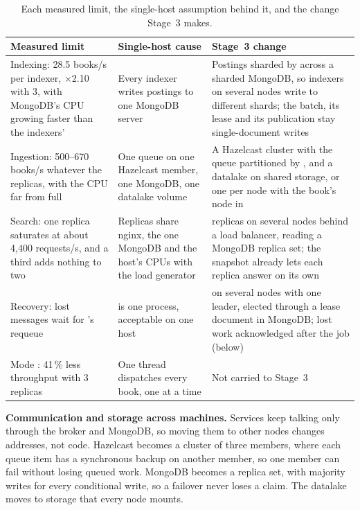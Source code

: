 \begin{table}[ht]
\centering
\small
\caption{Each measured limit, the single-host assumption behind it, and the change Stage~3 makes.}
\label{tab:stage3}
\begin{tabularx}{\textwidth}{@{}L{4.0cm}L{4.1cm}Y@{}}
\toprule
Measured limit & Single-host cause & Stage~3 change \\
\midrule
Indexing: 28.5 books/s per indexer, $\times$2.10 with 3, with MongoDB's CPU growing faster than the indexers' & Every indexer writes postings to one MongoDB server & Postings sharded by  across a sharded MongoDB, so indexers on several nodes write to different shards; the batch, its lease and its publication stay single-document writes \\
Ingestion: 500--670 books/s whatever the replicas, with the CPU far from full & One queue on one Hazelcast member, one MongoDB, one datalake volume & A Hazelcast cluster with the queue partitioned by , and a datalake on shared storage, or one per node with the book's node in  \\
Search: one  replica saturates at about 4{,}400 requests/s, and a third adds nothing to two & Replicas share nginx, the one MongoDB and the host's CPUs with the load generator &  replicas on several nodes behind a load balancer, reading a MongoDB replica set; the snapshot already lets each replica answer on its own \\
Recovery: lost messages wait for 's requeue &  is one process, acceptable on one host &  on several nodes with one leader, elected through a lease document in MongoDB; lost work acknowledged after the job (below) \\
Mode : 41\,\% less throughput with 3 replicas & One thread dispatches every book, one  at a time & Not carried to Stage~3 \\
\bottomrule
\end{tabularx}
\end{table}

\textbf{Communication and storage across machines.} Services keep talking only through the broker and MongoDB, so
moving them to other nodes changes addresses, not code. Hazelcast becomes a cluster of three members, where each queue
item has a synchronous backup on another member, so one member can fail without losing queued work. MongoDB becomes a
replica set, with majority writes for every conditional write, so a failover never loses a claim. The datalake moves to
storage that every node mounts.

